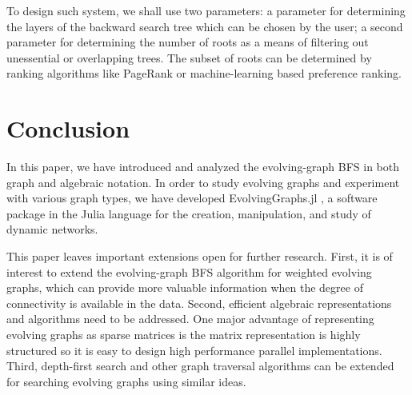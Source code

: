 \documentclass[11pt, conference, , compsocconf]{IEEEtran}
\theoremstyle{definition}
\begin{document}
To design such system, we shall use two parameters: 
 a parameter for 
determining the layers of the backward search tree which can be chosen by the user;
a second parameter for determining the number of roots as a means of 
filtering out unessential or overlapping trees. The subset of roots can be determined
by ranking algorithms like PageRank or machine-learning based preference ranking. 


\section{Conclusion}

In this paper, we have introduced and analyzed the evolving-graph BFS in both 
graph and algebraic notation. 
In order to study evolving graphs and experiment with various graph types, we have developed EvolvingGraphs.jl \cite{zhang15}, a software package in the Julia language \cite{bkse12} for the creation, manipulation, and study of dynamic networks.  

This paper leaves important extensions open for further research. First, it is 
of interest to extend the evolving-graph BFS algorithm for weighted evolving graphs, which can provide more valuable information when the degree of connectivity is available in the data. 
Second, efficient algebraic representations and algorithms need to be addressed. 
One major advantage of representing evolving graphs as sparse matrices
is the matrix representation is highly structured so it is easy to design
high performance parallel implementations. 
Third, depth-first search and other graph traversal algorithms can be 
extended for searching evolving graphs using similar ideas. 








%
%
%



 

\end{document}
